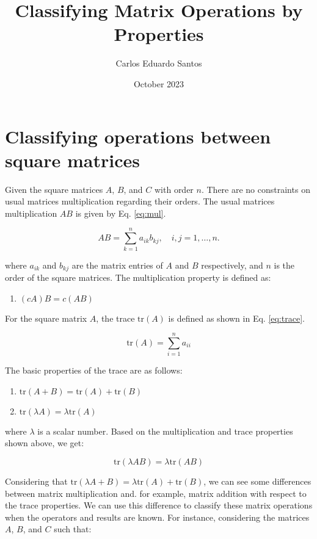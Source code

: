 \documentclass{article}
\title{Classifying Matrix Operations by Properties}
\author{Carlos Eduardo Santos}
\date{October 2023}
\begin{document}
	\maketitle
	
	\section{Classifying operations between square matrices}
	

	Given the square matrices \(A\), \(B\), and \(C\) with order \(n\). There are no constraints on usual matrices multiplication regarding their orders. The usual matrices multiplication \(AB\) is given by Eq. \eqref{eq:mul}.
	
	\begin{equation}
		AB = \sum_{k=1}^{n} a_{ik} b_{kj}, \quad i, j = 1, \ldots, n.
		\label{eq:mul}
	\end{equation}
	
	where \(a_{ik}\) and \(b_{kj}\) are the matrix entries of \(A\) and \(B\) respectively, and \(n\) is the order of the square matrices. The multiplication property is defined as:

	\begin{enumerate}
		\item \((cA)B = c(AB)\)
	\end{enumerate}
	
	For the square matrix \(A\), the trace \(\text{tr}(A)\) is defined as shown in Eq. \eqref{eq:trace}.
	
	\begin{equation}
		\text{tr}(A) = \sum_{i=1}^{n} a_{ii}
		\label{eq:trace}
	\end{equation}
	
	The basic properties of the trace are as follows:
	\begin{enumerate}
		\item \(\text{tr}(A+B) = \text{tr}(A) + \text{tr}(B)\)
		\item \(\text{tr}(\lambda A) = \lambda \text{tr}(A)\)
	\end{enumerate}
	
	where \(\lambda\) is a scalar number. Based on the multiplication and trace properties shown above, we get:
	
	\begin{equation}
		\text{tr}(\lambda AB) = \lambda \text{tr}(AB)
		\label{eq:trace_mul}
	\end{equation}
	
	Considering that \(\text{tr}(\lambda A + B) = \lambda \text{tr}(A) + \text{tr}(B)\), we can see some differences between matrix multiplication and. for example, matrix addition with respect to the trace properties. We can use this difference to classify these matrix operations when the operators and results are known. For instance, considering the matrices \(A\), \(B\), and \(C\) such that:
	
\end{document}
